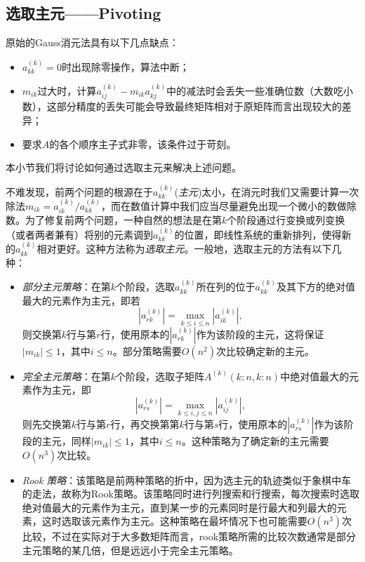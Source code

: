 \documentclass[a4paper,10pt]{ctexart}
\begin{document}
\subsection{选取主元——Pivoting}
原始的Gauss消元法具有以下几点缺点：
\begin{itemize}
    \item $ a_{kk}^{(k)} = 0 $时出现除零操作，算法中断；
    \item $ m_{ik} $过大时，计算$ a_{ij}^{(k)} - m_{ik}a^{(k)}_{kj} $中的减法时会丢失一些准确位数（大数吃小数），这部分精度的丢失可能会导致最终矩阵相对于原矩阵而言出现较大的差异；
    \item 要求$ A $的各个顺序主子式非零，该条件过于苛刻。
\end{itemize}
本小节我们将讨论如何通过选取主元来解决上述问题。

不难发现，前两个问题的根源在于$ a_{kk}^{(k)} $(\emph{主元})太小，在消元时我们又需要计算一次除法$ m_{ik} = a_{ik}^{(k)} / a_{kk}^{(k)} $，而在数值计算中我们应当尽量避免出现一个微小的数做除数。为了修复前两个问题，一种自然的想法是在第$ k $个阶段通过行变换或列变换（或者两者兼有）将别的元素调到$ a_{kk}^{(k)} $的位置，即线性系统的重新排列，使得新的$ a_{kk}^{(k)} $相对更好。这种方法称为\emph{选取主元}。一般地，选取主元的方法有以下几种：
\begin{itemize}
    \item \emph{部分主元策略}：在第$ k $个阶段，选取$ a_{kk}^{(k)} $所在列的位于$ a_{kk}^{(k)} $及其下方的绝对值最大的元素作为主元，即若
    \[
        |a_{rk}^{(k)}| = \max_{k\leqslant i\leqslant n} |a_{ik}^{(k)}|,
    \]
    则交换第$ k $行与第$ r $行，使用原本的$ |a_{rk}^{(k)}| $作为该阶段的主元，这将保证$ |m_{ik}|\leqslant 1 $，其中$ i\leqslant n $。部分策略需要$ O(n^2) $次比较确定新的主元。
    \item \emph{完全主元策略}：在第$ k $个阶段，选取子矩阵$ A^{(k)}(k:n,k:n) $中绝对值最大的元素作为主元，即
    \[
        |a_{rs}^{(k)}| = \max_{k\leqslant i,j\leqslant n} |a_{ij}^{(k)}|,
    \]
    则先交换第$ k $行与第$ r $行，再交换第第$ k $行与第$ s $行，使用原本的$ |a_{rs}^{(k)}| $作为该阶段的主元，同样$ |m_{ik}|\leqslant 1 $，其中$ i\leqslant n $。这种策略为了确定新的主元需要$ O(n^3) $次比较。
    \item \emph{Rook 策略}：该策略是前两种策略的折中，因为选主元的轨迹类似于象棋中车的走法，故称为Rook策略。该策略同时进行列搜索和行搜索，每次搜索时选取绝对值最大的元素作为主元，直到某一步的元素同时是行最大和列最大的元素，这时选取该元素作为主元。这种策略在最坏情况下也可能需要$ O(n^3) $次比较，不过在实际对于大多数矩阵而言，rook策略所需的比较次数通常是部分主元策略的某几倍，但是远远小于完全主元策略。
\end{itemize}
\end{document}
